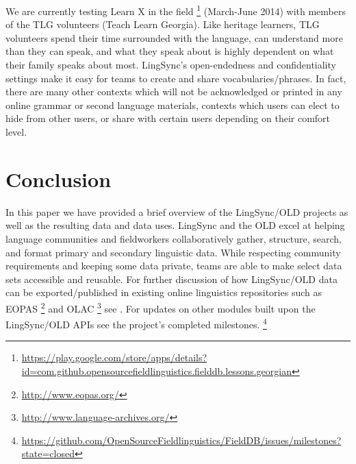 \documentclass[11pt]{article}
\begin{document}
We are currently testing Learn X in the field%
\footnote{\url{https://play.google.com/store/apps/details?id=com.github.opensourcefieldlinguistics.fielddb.lessons.georgian}} %
(March-June 2014) with members of the TLG volunteers (Teach Learn Georgia).
Like heritage learners, TLG volunteers spend their time surrounded with the
language, can understand more than they can speak, and what they speak about is
highly dependent on what their family speaks about most. LingSync's
open-endedness and confidentiality settings make it easy for teams to create
and share vocabularies/phrases.
In fact, there are many other contexts which will not be acknowledged or printed
in any online grammar or second language materials, contexts which users can
elect to hide from other users, or share with certain users depending on their
comfort level.



\section{Conclusion}

In this paper we have provided a brief overview of the LingSync/OLD projects as
well as the resulting data and data uses. LingSync and the OLD excel at helping
language communities and fieldworkers collaboratively gather, structure,
search, and format primary and secondary linguistic data. While respecting
community requirements and keeping some data private, teams are able to make
select data sets accessible and reusable. For further discussion of how
LingSync/OLD data can be exported/published in existing online linguistics
repositories such as EOPAS%
\footnote{\url{http://www.eopas.org/}} %
and OLAC%
\footnote{\url{http://www.language-archives.org/}} %
see \cite{lingsync:2012}. For updates on other modules built upon the
LingSync/OLD APIs see the project's completed milestones.%
\footnote{\url{https://github.com/OpenSourceFieldlinguistics/FieldDB/issues/milestones?state=closed}}





\end{document}
